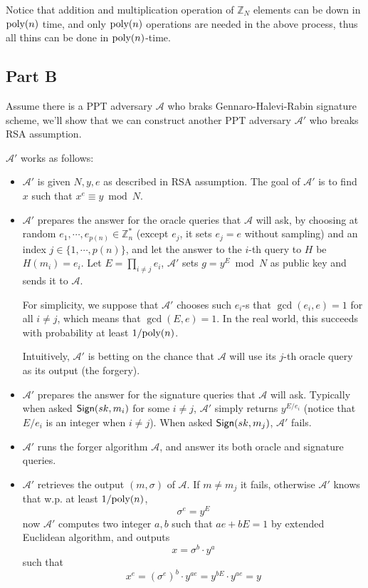 \documentclass[8pt]{article}
\theoremstyle{compact}
\begin{document}
Notice that addition and multiplication operation of $\mathbb Z_N$ elements can be down in $\text{poly}(n)$ time, and only $\text{poly}(n)$ operations are needed in the above process, thus all thins can be done in $\text{poly}(n)$-time.

\subsection*{Part B}
Assume there is a PPT adversary $\mathcal A$ who braks Gennaro-Halevi-Rabin signature scheme, we'll show that we can construct another PPT adversary $\mathcal A'$ who breaks RSA assumption.

$\mathcal A'$ works as follows: \begin{itemize}
	\item $\mathcal A'$ is given $N, y, e$ as described in RSA assumption. The goal of $\mathcal A'$ is to find $x$ such that $x^e \equiv y \bmod N$.
	\item $\mathcal A'$ prepares the answer for the oracle queries that $\mathcal A$ will ask, by choosing at random $e_1, \cdots, e_{p(n)} \in \mathbb Z_n^*$ (except $e_j$, it sets $e_j = e$ without sampling) and an index $j \in \{1, \cdots, p(n)\}$, and let the answer to the $i$-th query to $H$ be $H(m_i) = e_i$. Let $E = \prod\limits_{i \neq j}e_i$, $\mathcal A'$ sets $g = y^E \bmod N$ as public key and sends it to $\mathcal A$.
	
	For simplicity, we suppose that $\mathcal A'$ chooses such $e_i$-s that $\gcd(e_i, e) = 1$ for all $i \neq j$, which means that $\gcd(E, e) = 1$. In the real world, this succeeds with probability at least $1 / \text{poly}(n)$.

	Intuitively, $\mathcal A'$ is betting on the chance that $\mathcal A$ will use its $j$-th oracle query as its output (the forgery).

	\item $\mathcal A'$ prepares the answer for the signature queries that $\mathcal A$ will ask. Typically when asked $\textsf{Sign}(sk, m_i)$ for some $i \neq j$, $\mathcal A'$ simply returns $y^{E / e_i}$ (notice that $E / e_i$ is an integer when $i \neq j$). When asked $\textsf{Sign}(sk, m_j)$, $\mathcal A'$ fails.

	\item $\mathcal A'$ runs the forger algorithm $\mathcal A$, and answer its both oracle and signature queries.

	\item $\mathcal A'$ retrieves the output $(m, \sigma)$ of $\mathcal A$. If $m \neq m_j$ it fails, otherwise $\mathcal A'$ knows that w.p. at least $1 / \text{poly}(n)$, $$\sigma^{e} = y^{E}$$ now $\mathcal A'$ computes two integer $a, b$ such that $ae + bE = 1$ by extended Euclidean algorithm, and outputs $$x = \sigma^b \cdot y^a$$ such that $$x^e = (\sigma^{e})^b\cdot y^{ae} = y^{bE}\cdot y^{ae} = y$$
\end{itemize}
\end{document}
